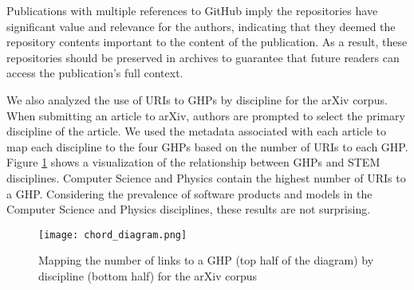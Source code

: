 Publications with multiple references to GitHub imply the repositories have significant value and relevance for the authors, indicating that they deemed the repository contents important to the content of the publication. As a result, these repositories should be preserved in archives to guarantee that future readers can access the publication's full context.

We also analyzed the use of URIs to GHPs by discipline for the arXiv corpus. When submitting an article to arXiv, authors are prompted to select the primary discipline of the article. We used the metadata associated with each article to map each discipline to the four GHPs based on the number of URIs to each GHP. Figure \ref{fig:chord_diagram} shows a visualization of the relationship between GHPs and STEM disciplines. Computer Science and Physics contain the highest number of URIs to a GHP. Considering the prevalence of software products and models in the Computer Science and Physics disciplines, these results are not surprising.

\begin{figure}
    \centering
    \texttt{[image: chord\_diagram.png]}
    \caption{Mapping the number of links to a GHP (top half of the diagram) by discipline (bottom half) for the arXiv corpus}
    \label{fig:chord_diagram}
\end{figure}